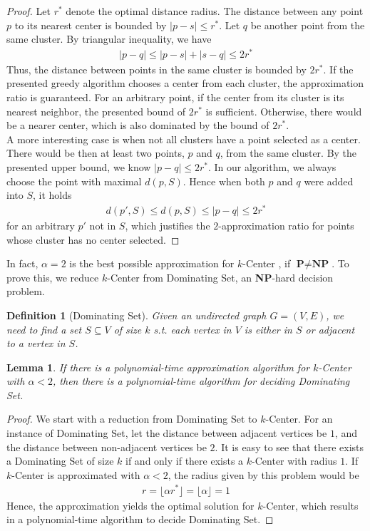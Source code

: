 \documentclass[11pt,psfig,times]{article}
\newcommand*{\PTIME}{\textbf{P}}
\newcommand*{\NP}{\textbf{NP}}
\newtheorem{lemma}[theorem]{Lemma}
\newtheorem{definition}[theorem]{Definition}
\begin{document}
\begin{proof}
    Let $r^*$ denote the optimal distance radius. 
    The distance between any point $p$ to its nearest center is bounded by $|p - s| \leq r^*$. 
    Let $q$ be another point from the same cluster. By triangular inequality, we have 
    \begin{align*}
        |p - q| \leq |p - s| + |s - q| \leq 2r^*    
    \end{align*}
    Thus, the distance between points in the same cluster is bounded by $2r^*$. If the presented greedy algorithm
    chooses a center from each cluster, the approximation ratio is guaranteed. For an arbitrary point, if the center from 
    its cluster is its nearest neighbor, the presented bound of $2r^*$ is sufficient. 
    Otherwise, there would be a nearer center, which is also dominated by the bound of $2r^*$.  \\
    A more interesting case is when not all clusters have a point selected as a center. 
    There would be then at least two points, $p$ and $q$,  from the same cluster. By the presented upper bound, 
    we know $|p - q| \leq 2r^*$. In our algorithm, we always choose the point with maximal $d(p, S)$. Hence 
    when both $p$ and $q$ were added into $S$, it holds
    \begin{align*}
        d(p', S) \leq d(p, S) \leq |p - q| \leq 2r^*
    \end{align*} 
    for an arbitrary $p'$ not in $S$, which justifies the $2$-approximation ratio for points whose cluster has no center selected.
\end{proof}
In fact, $\alpha = 2$ is the best possible approximation for $k$-Center , if $\PTIME \neq \NP$. To prove this, 
we reduce $k$-Center from Dominating Set, an \NP-hard decision problem.
\begin{definition}[Dominating Set]
    Given an undirected graph $G = (V, E)$, we need to find a set $S \subseteq V$ of size $k$ s.t. each vertex in $V$ is either in $S$ or adjacent to a vertex in $S$.
\end{definition}
\begin{lemma}
    If there is a polynomial-time approximation algorithm for $k$-Center  with $\alpha < 2$, 
    then there is a polynomial-time algorithm for deciding Dominating Set.
\end{lemma}
\begin{proof}
    We start with a reduction from Dominating Set to $k$-Center. For an instance of Dominating Set, 
    let the distance between adjacent vertices be $1$, and the distance between non-adjacent vertices be $2$. It is easy to see 
    that there exists a Dominating Set of size $k$ if and only if there exists a $k$-Center with radius $1$. 
    If $k$-Center is approximated with $\alpha < 2$, the radius given by this problem would be 
    \begin{align*}
    r = \lfloor \alpha r^* \rfloor = \lfloor \alpha \rfloor = 1
    \end{align*}
    Hence, the approximation yields the optimal solution for $k$-Center, which results 
    in a polynomial-time algorithm to decide Dominating Set.
\end{proof}
\end{document}
